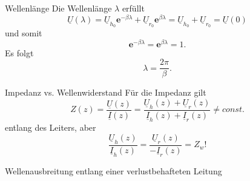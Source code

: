 \documentclass{beamer}
\begin{document}
\begin{frame}{Wellenlänge}
Die Wellenlänge $\lambda$ erfüllt
\begin{equation}
\underline{U}(\lambda) =
\underline{U}_{h_{0}} \mathbf{e}^{- \beta \lambda}
+
\underline{U}_{r_{0}} \mathbf{e}^{\beta \lambda}
= \underline{U}_{h_{0}} + \underline{U}_{r_{0}}
= \underline{U}(0)
\end{equation}
und somit
\[
\mathbf{e}^{- \beta \lambda} = \mathbf{e}^{\beta \lambda} = 1.
\]
Es folgt
\[
\lambda = \frac{2 \pi}{\beta}.
\]
\end{frame}


\begin{frame}{Impedanz vs. Wellenwiderstand}
Für die Impedanz gilt
\begin{equation*}
    Z(z) = \frac{\underline{U}(z)}{\underline{I}(z)} =
     \frac{\underline{U}_{h}(z) + \underline{U}_{r}(z)}{\underline{I}_{h}(z) +
     \underline{I}_{r}(z)} \ne const.
\end{equation*}
entlang des Leiters, aber
\[ \frac{\underline{U}_{h}(z)}{\underline{I}_{h}(z)}
= \frac{\underline{U}_{r}(z)}{- \underline{I}_{r}(z)} = Z_{w}! \]

\end{frame}


\begin{frame}{Wellenausbreitung entlang einer verlustbehafteten Leitung}

    \begin{figure}[!htb]
        \begin{center}
            
        \end{center}
    \end{figure}

\end{frame}
\end{document}

